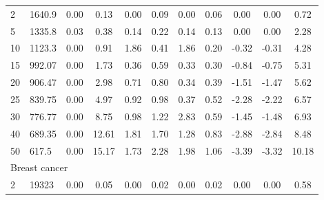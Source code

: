 {\begin{longtable}{@{}llccccccccc@{}}
\multicolumn{1}{l|}{2}  & \multicolumn{1}{l|}{1640.9}     & 0.00 & \multicolumn{1}{c|}{0.13}  & 0.00  & \multicolumn{1}{c|}{0.09} & 0.00  & \multicolumn{1}{c|}{0.06} & 0.00      & 0.00      & 0.72  \\
\multicolumn{1}{l|}{5}  & \multicolumn{1}{l|}{1335.8}     & 0.03 & \multicolumn{1}{c|}{0.38}  & 0.14  & \multicolumn{1}{c|}{0.22} & 0.14  & \multicolumn{1}{c|}{0.13} & 0.00      & 0.00      & 2.28  \\
\multicolumn{1}{l|}{10} & \multicolumn{1}{l|}{1123.3}     & 0.00 & \multicolumn{1}{c|}{0.91}  & 1.86  & \multicolumn{1}{c|}{0.41} & 1.86  & \multicolumn{1}{c|}{0.20} & -0.32     & -0.31     & 4.28  \\
\multicolumn{1}{l|}{15} & \multicolumn{1}{l|}{992.07}     & 0.00 & \multicolumn{1}{c|}{1.73}  & 0.36  & \multicolumn{1}{c|}{0.59} & 0.33  & \multicolumn{1}{c|}{0.30} & -0.84     & -0.75     & 5.31  \\
\multicolumn{1}{l|}{20} & \multicolumn{1}{l|}{906.47}     & 0.00 & \multicolumn{1}{c|}{2.98}  & 0.71  & \multicolumn{1}{c|}{0.80} & 0.34  & \multicolumn{1}{c|}{0.39} & -1.51     & -1.47     & 5.62  \\
\multicolumn{1}{l|}{25} & \multicolumn{1}{l|}{839.75}     & 0.00 & \multicolumn{1}{c|}{4.97}  & 0.92  & \multicolumn{1}{c|}{0.98} & 0.37  & \multicolumn{1}{c|}{0.52} & -2.28     & -2.22     & 6.57  \\
\multicolumn{1}{l|}{30} & \multicolumn{1}{l|}{776.77}     & 0.00 & \multicolumn{1}{c|}{8.75}  & 0.98  & \multicolumn{1}{c|}{1.22} & 2.83  & \multicolumn{1}{c|}{0.59} & -1.45     & -1.48     & 6.93  \\
\multicolumn{1}{l|}{40} & \multicolumn{1}{l|}{689.35}     & 0.00 & \multicolumn{1}{c|}{12.61} & 1.81  & \multicolumn{1}{c|}{1.70} & 1.28  & \multicolumn{1}{c|}{0.83} & -2.88     & -2.84     & 8.48  \\
\multicolumn{1}{l|}{50} & \multicolumn{1}{l|}{617.5}      & 0.00 & \multicolumn{1}{c|}{15.17} & 1.73  & \multicolumn{1}{c|}{2.28} & 1.98  & \multicolumn{1}{c|}{1.06} & -3.39     & -3.32     & 10.18 \\ \hline
\multicolumn{11}{l}{Breast cancer}                                                                                                                                                                    \\ \hline
\multicolumn{1}{l|}{2}  & \multicolumn{1}{l|}{19323}      & 0.00 & \multicolumn{1}{c|}{0.05}  & 0.00  & \multicolumn{1}{c|}{0.02} & 0.00  & \multicolumn{1}{c|}{0.02} & 0.00      & 0.00      & 0.58  \\

\end{longtable}}
